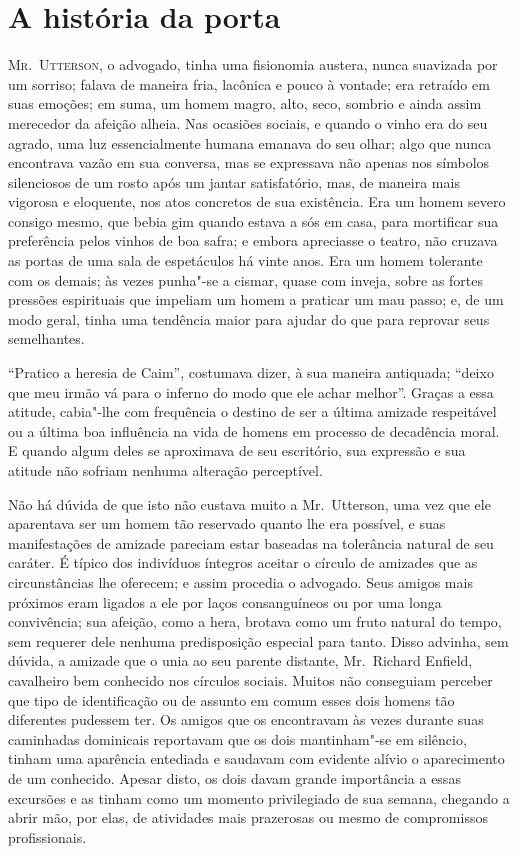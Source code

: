 \chapter[A história da porta]{A história da porta}

\textsc{Mr.~Utterson,} o advogado, tinha uma fisionomia austera, nunca suavizada
por um sorriso; falava de maneira fria, lacônica e pouco à vontade; era
retraído em suas emoções; em suma, um homem magro, alto, seco, sombrio
e ainda assim merecedor da afeição alheia.  Nas ocasiões sociais, e
quando o vinho era do seu agrado, uma luz essencialmente humana emanava
do seu olhar; algo que nunca encontrava vazão em sua conversa, mas se
expressava não apenas nos símbolos silenciosos de um rosto após um
jantar satisfatório, mas, de maneira mais vigorosa e eloquente, nos
atos concretos de sua existência.  Era um homem severo consigo mesmo,
que bebia gim quando estava a sós em casa, para mortificar sua
preferência pelos vinhos de boa safra; e embora apreciasse o teatro,
não cruzava as portas de uma sala de espetáculos há vinte anos.  Era um
homem tolerante com os demais; às vezes punha"-se a cismar, quase com
inveja, sobre as fortes pressões espirituais que impeliam um homem a
praticar um mau passo; e, de um modo geral, tinha uma tendência maior
para ajudar do que para reprovar seus semelhantes.

“Pratico a heresia de Caim”, costumava dizer, à sua maneira antiquada;
“deixo que meu irmão vá para o inferno do modo que ele achar melhor”. 
Graças a essa atitude, cabia"-lhe com frequência o destino de ser a
última amizade respeitável ou a última boa influência na vida de homens
em processo de decadência moral.  E quando algum deles se aproximava de
seu escritório, sua expressão e sua atitude não sofriam nenhuma
alteração perceptível.

Não há dúvida de que isto não custava muito a Mr.~Utterson, uma vez que
ele aparentava ser um homem tão reservado quanto lhe era possível, e
suas manifestações de amizade pareciam estar baseadas na tolerância
natural de seu caráter.  É típico dos indivíduos íntegros aceitar o
círculo de amizades que as circunstâncias lhe oferecem; e assim
procedia o advogado.  Seus amigos mais próximos eram ligados a ele por
laços consanguíneos ou por uma longa convivência; sua afeição, como a
hera, brotava como um fruto natural do tempo, sem requerer dele nenhuma
predisposição especial para tanto.  Disso advinha, sem dúvida, a
amizade que o unia ao seu parente distante, Mr.~Richard Enfield,
cavalheiro bem conhecido nos círculos sociais.  Muitos não conseguiam
perceber que tipo de identificação ou de assunto em comum esses dois
homens tão diferentes pudessem ter.  Os amigos que os encontravam às
vezes durante suas caminhadas dominicais reportavam que os dois
mantinham"-se em silêncio, tinham uma aparência entediada e saudavam com
evidente alívio o aparecimento de um conhecido.  Apesar disto, os dois
davam grande importância a essas excursões e as tinham como um momento
privilegiado de sua semana, chegando a abrir mão, por elas, de
atividades mais prazerosas ou mesmo de compromissos profissionais.

